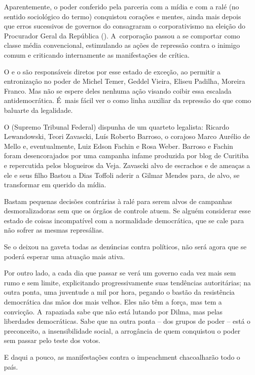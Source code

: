 Aparentemente, o poder conferido pela parceria com a mídia e com a ralé
(no sentido sociológico do termo) conquistou corações e mentes, ainda
mais depois que erros sucessivos de governos do  consagraram o
corporativismo na eleição do Procurador Geral da República (). A~corporação passou a se comportar como classe média convencional,
estimulando as ações de repressão contra o inimigo comum e criticando
internamente as manifestações de crítica.

O  e o  são responsáveis diretos por esse estado de exceção, ao
permitir a entronização no poder de Michel Temer, Geddel Vieira, Eliseu
Padilha, Moreira Franco. Mas não se espere deles nenhuma ação visando
coibir essa escalada antidemocrática. É~mais fácil ver o  como linha
auxiliar da repressão do que como baluarte da legalidade.

O  (Supremo Tribunal Federal) dispunha de um quarteto legalista:
Ricardo Lewandowski, Teori Zavascki, Luís Roberto Barroso, o corajoso
Marco Aurélio de Mello e, eventualmente, Luiz Edson Fachin e Rosa Weber.
Barroso e Fachin foram desencorajados por uma campanha infame produzida
por blog de Curitiba e repercutida pelos blogueiros da Veja. Zavascki
alvo de escrachos e de ameaças a ele e seus filho Bastou a Dias Toffoli
aderir a Gilmar Mendes para, de alvo, se transformar em querido da
mídia.

Bastam pequenas decisões contrárias à ralé para serem alvos de campanhas
desmoralizadoras sem que os órgãos de controle atuem. Se alguém
considerar esse estado de coisas incompatível com a normalidade
democrática, que se cale para não sofrer as mesmas represálias.

Se o  deixou na gaveta todas as denúncias contra políticos, não será
agora que se poderá esperar uma atuação mais ativa.

Por outro lado, a cada dia que passar se verá um governo cada vez mais
sem rumo e sem limite, explicitando progressivamente suas tendências
autoritárias; na outra ponta, uma juventude a mil por hora, pegando o
bastão da resistência democrática das mãos dos mais velhos. Eles não têm
a força, mas tem a convicção. A~rapaziada sabe que não está lutando por
Dilma, mas pelas liberdades democráticas. Sabe que na outra ponta -- dos
grupos de poder -- está o preconceito, a insensibilidade social, a
arrogância de quem conquistou o poder sem passar pelo teste dos votos.

E daqui a pouco, as manifestações contra o impeachment chacoalharão todo
o país.

